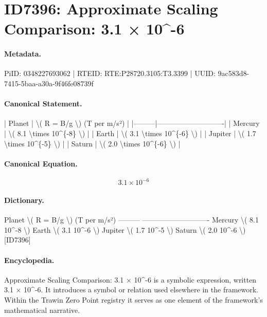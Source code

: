 \section*{ID7396: Approximate Scaling Comparison: 3.1 × 10\textasciicircum{}-6}
\paragraph{Metadata.}
PiID: 0348227693062 | RTEID: RTE:P28720.3105:T3.3399 | UUID: 9ac583d8-7415-5baa-a30a-9f46fe08739f

\paragraph{Canonical Statement.}
| Planet | \textbackslash{}( R = B/g \textbackslash{}) (T per m/s²) | |---------|----------------------------| | Mercury | \textbackslash{}( 8.1 \textbackslash{}times 10\textasciicircum{}\{-8\} \textbackslash{}) | | Earth | \textbackslash{}( 3.1 \textbackslash{}times 10\textasciicircum{}\{-6\} \textbackslash{}) | | Jupiter | \textbackslash{}( 1.7 \textbackslash{}times 10\textasciicircum{}\{-5\} \textbackslash{}) | | Saturn | \textbackslash{}( 2.0 \textbackslash{}times 10\textasciicircum{}\{-6\} \textbackslash{}) |

\paragraph{Canonical Equation.}
\[
3.1 \times 10^{-6}
\]

\paragraph{Dictionary.}
Planet \textbackslash{}( R = B/g \textbackslash{}) (T per m/s²) --------- ---------------------------- Mercury \textbackslash{}( 8.1 10\textasciicircum{}-8 \textbackslash{}) Earth \textbackslash{}( 3.1 10\textasciicircum{}-6 \textbackslash{}) Jupiter \textbackslash{}( 1.7 10\textasciicircum{}-5 \textbackslash{}) Saturn \textbackslash{}( 2.0 10\textasciicircum{}-6 \textbackslash{}) [ID7396]

\paragraph{Encyclopedia.}
Approximate Scaling Comparison: 3.1 × 10\textasciicircum{}-6 is a symbolic expression, written 3.1 × 10\textasciicircum{}-6. It introduces a symbol or relation used elsewhere in the framework. Within the Trawin Zero Point registry it serves as one element of the framework's mathematical narrative.
